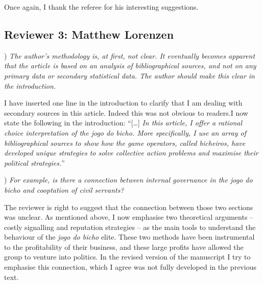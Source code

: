 \documentclass[a4paper,12pt]{article}
\begin{document}
\vspace{.5cm}

Once again, I thank the referee for his interesting suggestions.

\newpage

\subsection*{Reviewer 3: Matthew Lorenzen}%
\label{sub:reviewer_3_matthew_lorenzen}

) \textit{The author's methodology is, at first, not clear. It eventually becomes apparent that the article is based on an analysis of bibliographical sources, and not on any primary data or secondary statistical data. The author should make this clear in the introduction.}

\vspace{.25cm}

I have inserted one line in the introduction to clarify that I am dealing with secondary sources in this article. Indeed this was not obvious to readers.I now state the following in the introduction: ``[\dots] \textit{In this article, I offer a rational choice interpretation of the \emph{jogo do bicho}. More specifically, I use an array of bibliographical sources to show how the game operators, called \emph{bicheiros}, have developed unique strategies to solve collective action problems and maximise their political strategies.}''

\vspace{.5cm}

) \textit{For example, is there a connection between internal governance in the jogo do bicho and cooptation of civil servants?}

\vspace{.25cm}

The reviewer is right to suggest that the connection between those two sections was unclear. As mentioned above, I now emphasise two theoretical arguments -- costly signalling and reputation strategies -- as the main tools to understand the behaviour of the \textit{jogo do bicho} elite. These two methods have been instrumental to the profitability of their business, and these large profits have allowed the group to venture into politics. In the revised version of the manuscript I try to emphasise this connection, which I agree was not fully developed in the previous text. 

\vspace{.5cm}
\end{document}
